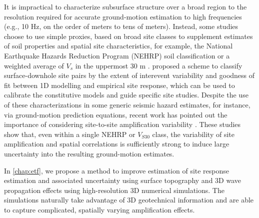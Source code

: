 It is impractical to characterize subsurface structure over a broad region to the resolution required for accurate ground-motion estimation to high frequencies (e.g., 10 Hz, on the order of meters to tens of meters). Instead, some studies choose to use simple proxies, based on broad site classes to supplement estimates of soil properties and spatial site characteristics, for example, the National Earthquake Hazards Reduction Program (NEHRP) soil classification \citep{bssc2003NEHRPRecommended2003,akkarEmpiricalEquationsPrediction2010} or a weighted average of $V_s$ in the uppermost 30 m \citep[$V_{S30}$, e.g., ][]{abrahamsonSummaryAbrahamsonSilva2008,idrissNGAWest2EmpiricalModel2014}. \citet{thompsonTaxonomySiteResponse2012} proposed a scheme to classify surface-downhole site pairs by the extent of interevent variability and goodness of fit between 1D modelling and empirical site response, which can be used to calibrate the constitutive models and guide specific site studies. Despite the use of these characterizations in some generic seismic hazard estimates, for instance, via ground-motion prediction equations, recent work has pointed out the importance of considering site-to-site amplification variability \citep{atkinsonEarthquakeGroundmotionPrediction2006,atikVariabilityGroundmotionPrediction2010}. These studies show that, even within a single NEHRP or $V_{S30}$ class, the variability of site amplification and spatial correlations is sufficiently strong to induce large uncertainty into the resulting ground-motion estimates.

In \cref{chap:etf}, we propose a method to improve estimation of site response estimation and associated uncertainty using surface topography and 3D wave propagation effects using high-resolution 3D numerical simulations. The simulations naturally take advantage of 3D geotechnical information and are able to capture complicated, spatially varying amplification effects.


\renewcommand{\thetable}{\arabic{table}}
\renewcommand{\thefigure}{\arabic{figure}}




